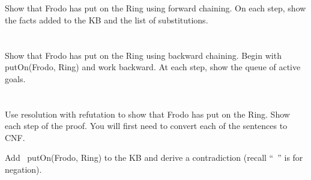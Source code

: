 \documentclass[paper=a4, fontsize=11pt]{scrartcl} %
\begin{document}
\section{}

\begin{fancyquotes}
  Show that Frodo has put on the Ring using forward chaining. On each
  step, show the facts added to the KB and the list of substitutions.
\end{fancyquotes}


\pagebreak

\section{}

\begin{fancyquotes}
  Show that Frodo has put on the Ring using backward chaining. Begin
  with putOn(Frodo, Ring) and work backward. At each step, show the
  queue of active goals.
\end{fancyquotes}


\pagebreak

\section{}

\begin{fancyquotes}
  Use resolution with refutation to show that Frodo has put on the
  Ring. Show each step of the proof. You will first need to convert
  each of the sentences to CNF.

  Add ~putOn(Frodo, Ring) to the KB and derive a contradiction (recall
  “~” is for negation).
\end{fancyquotes}

\pagebreak


\section{}
\end{document}
